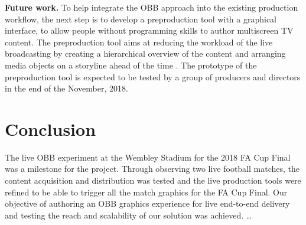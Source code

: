 \documentclass[sigchi-a, authorversion]{acmart}
\begin{document}
\textbf{Future work.} To help integrate the OBB approach into the existing production workflow, the next step is to develop a preproduction tool with a graphical interface, to allow people without programming skills to author multiscreen TV content. The preproduction tool aims at reducing the workload of the live broadcasting by creating a hierarchical overview of the content and arranging media objects on a storyline ahead of the time \cite{Li:2018_TVX}. The prototype of the preproduction tool is expected to be tested by a group of producers and directors in the end of the November, 2018.

\section{Conclusion}
The live OBB experiment at the Wembley Stadium for the 2018 FA Cup Final was a milestone for the project. Through observing two live football matches, the content acquisition and distribution was tested and the live production tools were refined to be able to trigger all the match graphics for the FA Cup Final. Our objective of authoring an OBB graphics experience for live end-to-end delivery and testing the reach and scalability of our solution was achieved. 
\ldots



\end{document}
